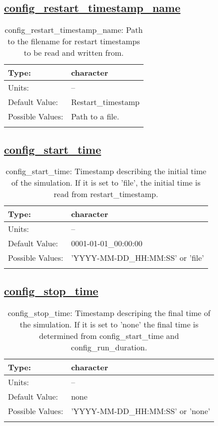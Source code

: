 \subsection[config\_restart\_timestamp\_name]{\hyperref[sec:nm_tab_time_management]{config\_restart\_timestamp\_name}}
\label{subsec:nm_sec_config_restart_timestamp_name}
\begin{center}
\begin{longtable}{| p{2.0in} || p{4.0in} |}
    \hline
    Type: & character \\
    \hline
    Units: & -- \\
    \hline
    Default Value: & Restart\_timestamp \\
    \hline
    Possible Values: & Path to a file. \\
    \hline
    \caption{config\_restart\_timestamp\_name: Path to the filename for restart timestamps to be read and written from.}
\end{longtable}
\end{center}
\subsection[config\_start\_time]{\hyperref[sec:nm_tab_time_management]{config\_start\_time}}
\label{subsec:nm_sec_config_start_time}
\begin{center}
\begin{longtable}{| p{2.0in} || p{4.0in} |}
    \hline
    Type: & character \\
    \hline
    Units: & -- \\
    \hline
    Default Value: & 0001-01-01\_00:00:00 \\
    \hline
    Possible Values: & 'YYYY-MM-DD\_HH:MM:SS' or 'file' \\
    \hline
    \caption{config\_start\_time: Timestamp describing the initial time of the simulation. If it is set to 'file', the initial time is read from restart\_timestamp.}
\end{longtable}
\end{center}
\subsection[config\_stop\_time]{\hyperref[sec:nm_tab_time_management]{config\_stop\_time}}
\label{subsec:nm_sec_config_stop_time}
\begin{center}
\begin{longtable}{| p{2.0in} || p{4.0in} |}
    \hline
    Type: & character \\
    \hline
    Units: & -- \\
    \hline
    Default Value: & none \\
    \hline
    Possible Values: & 'YYYY-MM-DD\_HH:MM:SS' or 'none' \\
    \hline
    \caption{config\_stop\_time: Timestamp descriping the final time of the simulation. If it is set to 'none' the final time is determined from config\_start\_time and config\_run\_duration.}
\end{longtable}
\end{center}
